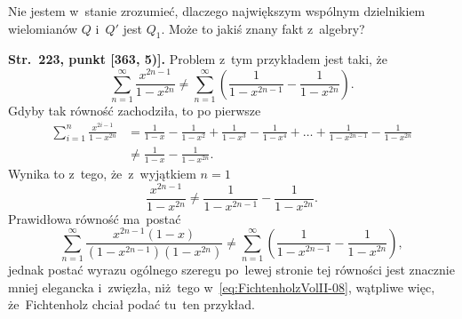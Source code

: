 \documentclass[a4paper,11pt]{article}
\begin{document}
\vspace{\spaceFour}





\noindent
{} Nie jestem w~stanie zrozumieć, dlaczego największym
wspólnym dzielnikiem wielomianów $Q$ i~$Q'$ jest $Q_{ 1 }$. Może to
jakiś znany fakt z~algebry? \Dok

\vspace{\spaceFour}





\noindent
\textbf{Str.~223, punkt [363, 5)].} Problem z~tym przykładem
jest taki, że
\begin{equation}
  \label{eq:FichtenholzVolII-08}
  \sum_{ n = 1 }^{ \infty } \frac{ x^{ 2n - 1 } }{ 1 - x^{ 2n } }
  \neq \sum_{ n = 1 }^{ \infty } \left( \frac{ 1 }{ 1 - x^{ 2n - 1 } }
    - \frac{ 1 }{ 1 - x^{ 2n } } \right).
\end{equation}
Gdyby tak równość zachodziła, to po pierwsze
\begin{equation}
  \label{eq:FichtenholzVolII-09}
  \begin{split}
    \sum_{ i = 1 }^{ n } \frac{ x^{ 2i - 1 } }{ 1 - x^{ 2n } }
    &=
      \frac{ 1 }{ 1 - x } - \frac{ 1 }{ 1 - x^{ 2 } }
      + \frac{ 1 }{ 1 - x^{ 3 } } - \frac{ 1 }{ 1 - x^{ 4 } }
      + \ldots + \frac{ 1 }{ 1 - x^{ 2n - 1 } }
      - \frac{ 1 }{ 1 - x^{ 2n } } \\
    &\neq \frac{ 1 }{ 1 - x } - \frac{ 1 }{ 1 - x^{ 2n } }.
  \end{split}
\end{equation}
Wynika to z~tego, że~z~wyjątkiem $n = 1$
\begin{equation}
  \label{eq:FichtenholzVolII-10}
  \frac{ x^{ 2n - 1 } }{ 1 - x^{ 2n } } \neq
  \frac{ 1 }{ 1 - x^{ 2n - 1 } } - \frac{ 1 }{ 1 - x^{ 2n } }.
\end{equation}
Prawidłowa równość ma~postać
\begin{equation}
  \label{eq:FichtenholzVolII-11}
  \sum_{ n = 1 }^{ \infty } \frac{ x^{ 2n - 1 } ( 1 - x ) }{ ( 1 - x^{ 2n - 1 } )
    ( 1 - x^{ 2n } ) }
  \neq
  \sum_{ n = 1 }^{ \infty } \left( \frac{ 1 }{ 1 - x^{ 2n - 1 } }
    - \frac{ 1 }{ 1 - x^{ 2n } } \right),
\end{equation}
jednak postać wyrazu ogólnego szeregu po~lewej stronie tej równości
jest znacznie mniej elegancka i~zwięzła, niż~tego
w~\eqref{eq:FichtenholzVolII-08}, wątpliwe więc, że~Fichtenholz chciał
podać tu~ten przykład.
\end{document}
